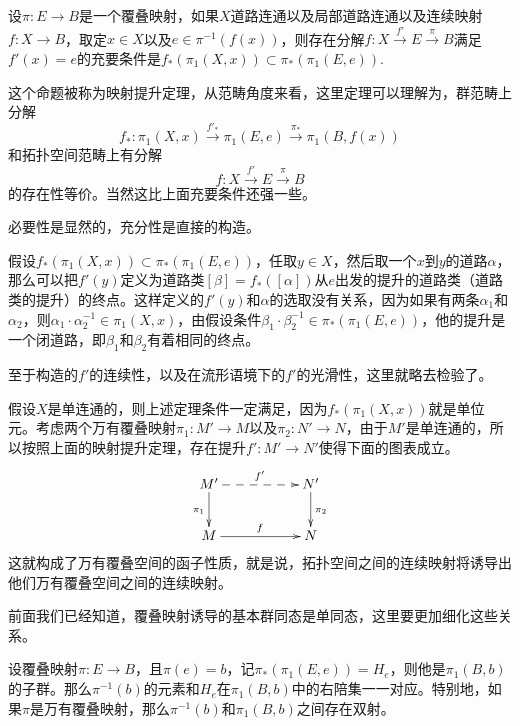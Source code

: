 \para 设$\pi:E\to B$是一个覆叠映射，如果$X$道路连通以及局部道路连通以及连续映射$f:X\to B$，取定$x\in X$以及$e\in \pi^{-1}(f(x))$，则存在分解$f:X\xrightarrow{f'} E\xrightarrow{\pi} B$满足$f'(x)=e$的充要条件是$f_*(\pi_1(X,x))\subset \pi_*(\pi_1(E,e))$. \endpara

这个命题被称为映射提升定理，从范畴角度来看，这里定理可以理解为，群范畴上分解
\[f_*:\pi_1(X,x)\xrightarrow{f'_*} \pi_1(E,e)\xrightarrow{\pi_*} \pi_1(B,f(x))\]
和拓扑空间范畴上有分解
\[f:X\xrightarrow{f'} E\xrightarrow{\pi} B\]
的存在性等价。当然这比上面充要条件还强一些。

必要性是显然的，充分性是直接的构造。

假设$f_*(\pi_1(X,x))\subset \pi_*(\pi_1(E,e))$，任取$y\in X$，然后取一个$x$到$y$的道路$\alpha$，那么可以把$f'(y)$定义为道路类$[\beta]=f_*([\alpha])$从$e$出发的提升的道路类（道路类的提升）的终点。这样定义的$f'(y)$和$\alpha$的选取没有关系，因为如果有两条$\alpha_1$和$\alpha_2$，则$\alpha_1\cdot\alpha_2^{-1}\in \pi_1(X,x)$，由假设条件$\beta_1\cdot\beta_2^{-1}\in \pi_*(\pi_1(E,e))$，他的提升是一个闭道路，即$\beta_1$和$\beta_2$有着相同的终点。

至于构造的$f'$的连续性，以及在流形语境下的$f'$的光滑性，这里就略去检验了。

\para 假设$X$是单连通的，则上述定理条件一定满足，因为$f_*(\pi_1(X,x))$就是单位元。考虑两个万有覆叠映射$\pi_1:M'\to M$以及$\pi_2:N'\to N$，由于$M'$是单连通的，所以按照上面的映射提升定理，存在提升$f':M'\to N'$使得下面的图表成立。
\[
\xymatrix{
	M'\ar@{-->}[rr]^{f'} \ar[d]_{\pi_1}&&N' \ar[d]^{\pi_2}\\
	M\ar[rr]^{f}&& N
}
\]
这就构成了万有覆叠空间的函子性质，就是说，拓扑空间之间的连续映射将诱导出他们万有覆叠空间之间的连续映射。\endpara

前面我们已经知道，覆叠映射诱导的基本群同态是单同态，这里要更加细化这些关系。

\begin{pro}
设覆叠映射$\pi:E\to B$，且$\pi(e)=b$，记$\pi_*(\pi_1(E,e))=H_e$，则他是$\pi_1(B,b)$的子群。那么$\pi^{-1}(b)$的元素和$H_e$在$\pi_1(B,b)$中的右陪集一一对应。特别地，如果$\pi$是万有覆叠映射，那么$\pi^{-1}(b)$和$\pi_1(B,b)$之间存在双射。
\end{pro}

